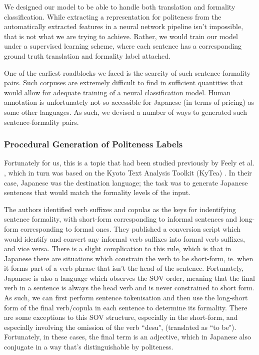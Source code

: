 \documentclass[11pt]{article}
\begin{document}
We designed our model to be able to handle both translation and formality classification. While extracting a representation for politeness from the automatically extracted features in a neural network pipeline isn't impossible, that is not what we are trying to achieve. Rather, we would train our model under a supervised learning scheme, where each sentence has a corresponding ground truth translation and formality label attached.

One of the earliest roadblocks we faced is the scarcity of such sentence-formality pairs. Such corpuses are extremely difficult to find in sufficient quantities that would allow for adequate training of a neural classification model. Human annotation is unfortunately not so accessible for Japanese (in terms of pricing) as some other languages. As such, we devised a number of ways to generated such sentence-formality pairs.

\subsubsection{Procedural Generation of Politeness Labels}

Fortunately for us, this is a topic that had been studied previously by Feely et al. \cite{Feely:19}, which in turn was based on the Kyoto Text Analysis Toolkit (KyTea) \cite{Neubig:11}. In their case, Japanese was the destination language; the task was to generate Japanese sentences that would match the formality levels of the input. 

The authors identified verb suffixes and copulas as the keys for indentifying sentence formality, with short-form corresponding to informal sentences and long-form corresponding to formal ones. They published a conversion script which would identify and convert any informal verb suffixes into formal verb suffixes, and vice versa. There is a slight complication to this rule, which is that in Japanese there are situations which constrain the verb to be short-form, ie. when it forms part of a verb phrase that isn't the head of the sentence. Fortunately, Japanese is also a language which observes the SOV order, meaning that the final verb in a sentence is always the head verb and is never constrained to short form. As such, we can first perform sentence tokenisation and then use the long-short form of the final verb/copula in each sentence to determine its formality. There are some exceptions to this SOV structure, especially in the short-form, and especially involving the omission of the verb ``desu", (translated as ``to be"). Fortunately, in these cases, the final term is an adjective, which in Japanese also conjugate in a way that's distinguishable
by politeness. 
\end{document}
